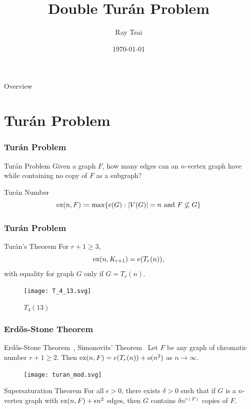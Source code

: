\documentclass{beamer}
\title{Double Turán Problem}
\author{Ray Tsai}
\date{\today}
\newcommand*{\ex}{\textnormal{ex}}
\begin{document}
\frame{\titlepage}

\begin{frame}{Overview}
  \tableofcontents
\end{frame}

\section{Turán Problem}

\begin{frame}
\frametitle{Turán Problem}

\begin{block}{Turán Problem}
  Given a graph $F$, how many edges can an $n$-vertex graph have while containing no copy of $F$ as a subgraph?
\end{block}

\pause

\vspace{0.5cm}

\begin{block}{Turán Number}
  \[
    \ex(n, F) \coloneq \max \{ e(G) : |V(G)| = n \text{ and } F \not\subseteq G \}
  \]
\end{block}
\end{frame}

\begin{frame}
  \frametitle{Turán Problem}

  \begin{block}{Turán's Theorem \cite{Turan1941}}
    For $r + 1 \geq 3$,
    \[
      \ex(n, K_{r + 1}) = e(T_{r}(n)),
    \]
    with equality for graph $G$ only if $G = T_{r}(n)$.
  \end{block}

  \begin{figure}
    \centering
    \texttt{[image: T\_4\_13.svg]}
    \caption{$T_4(13)$}
  \end{figure}
\end{frame}

\begin{frame}
  \frametitle{Erd\H{o}s-Stone Theorem}

  \begin{block}{Erd\H{o}s-Stone Theorem~\cite{ErdosStone1946}, Simonovits' Theorem~\cite{ErdosSimonovits1966}}
    Let $F$ be any graph of chromatic number $r + 1 \geq 2$. Then $\ex(n, F) = e(T_r(n)) + o(n^2)$ as $n \rightarrow \infty$.
  \end{block}

  \begin{figure}
    \centering
    \texttt{[image: turan\_mod.svg]}
  \end{figure}

  \pause

  \begin{block}{Supersaturation Theorem \cite{ErdosSimonovits1983}}
    For all $\epsilon > 0$, there exists $\delta > 0$ such that if $G$ is a $n$-vertex graph with $\ex(n,F) + \epsilon n^2$ edges, then  $G$ contains $\delta n^{v(F)}$ copies of $F$.
  \end{block}
\end{frame}
\end{document}
